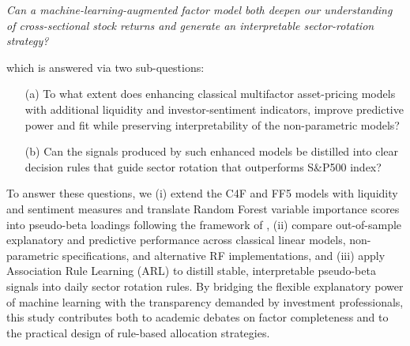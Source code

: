\textit{Can a machine-learning-augmented factor model both deepen our understanding of cross-sectional stock returns and generate an interpretable sector-rotation strategy?}

which is answered via two sub-questions:
\begin{enumerate}
   \item[(a)] To what extent does enhancing classical multifactor asset-pricing models with additional liquidity and investor-sentiment indicators, improve predictive power and fit while preserving interpretability of the non-parametric models?\\
  \item[(b)] Can the signals produced by such enhanced models be distilled into clear decision rules that guide sector rotation that outperforms S\&P500 index?\\
\end{enumerate}

To answer these questions, we (i) extend the C4F and FF5 models with liquidity and sentiment measures and translate Random Forest variable importance scores into pseudo-beta loadings following the framework of , (ii) compare out-of-sample explanatory and predictive performance across classical linear models, non-parametric specifications, and alternative RF implementations, and (iii) apply Association Rule Learning (ARL) to distill stable, interpretable pseudo-beta signals into daily sector rotation rules. By bridging the flexible explanatory power of machine learning with the transparency demanded by investment professionals, this study contributes both to academic debates on factor completeness and to the practical design of rule-based allocation strategies. 


